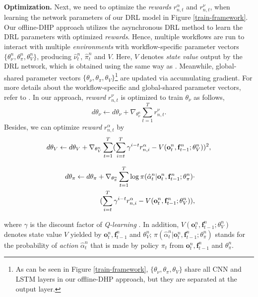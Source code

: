 \documentclass[10pt,journal,compsoc]{IEEEtran}
\begin{document}
\textbf{Optimization.}
Next, we need to optimize the \textit{rewards} $r^{\alpha}_{n,t}$ and $r^{\nu}_{n,t}$, when learning the network parameters of our DRL model in Figure \ref{train-framework}.
Our offline-DHP approach utilizes the asynchronous DRL method \cite{mnih2016asynchronous} to learn the DRL parameters with optimized \textit{rewards}.
Hence, multiple workflows are run to interact with multiple \textit{environments} with workflow-specific parameter vectors $\{ \theta^{n}_{\nu}, \theta^{n}_{\pi}, \theta^{n}_{V} \}$, producing $\hat{\nu}^n_t$, $\hat{\pi}^n_t$ and $V$.
Here, $V$ denotes \textit{state value} output by the DRL network, which is obtained using the same way as \cite{mnih2016asynchronous}.
Meanwhile, global-shared parameter vectors $\{ \theta_{\nu}, \theta_{\pi}, \theta_{V} \}$\footnote{As can be seen in Figure \ref{train-framework}, $\{ \theta_{\nu}, \theta_{\pi}, \theta_{V} \}$ share all CNN and LSTM layers in our offline-DHP approach, but they are separated at the output layer.} are updated via accumulating gradient.
For more details about the workflow-specific and global-shared parameter vectors, refer to \cite{mnih2016asynchronous}.
In our approach, \textit{reward} $r^{\nu}_{n,t}$ is optimized to train $\theta_{\nu}$ as follows,
\begin{equation}
\label{opt-1}
d \theta_{\nu} \leftarrow d \theta_{\nu} + \nabla_{\theta_{\nu}^{n}} \sum_{t=1}^{T} r^{\nu}_{n,t}.
\end{equation}
Besides, we can optimize \textit{reward} $r^{\alpha}_{n,t}$ by
\begin{equation}
\label{opt-2}
\small d \theta_{V} \leftarrow d \theta_{V} + \nabla_{\theta_{V}^{n}} \sum_{t = 1}^{T} (\sum_{i=t}^{T} \gamma^{i-t} r^{\alpha}_{n,i} - V(\mathbf{o}^n_{t}, \mathbf{f}^n_{t-1} ; \theta_{V}^{n}))^2,
\end{equation}
\begin{small}
\begin{eqnarray}
\label{opt-3}
\hspace{0.1cm} \nonumber d \theta_{\pi} \leftarrow d \theta_{\pi} +\nabla_{\theta_{\pi}^{n}} \sum_{t = 1}^{T} \log \pi( \hat{\alpha}^n_{t} | \mathbf{o}^n_{t}, \mathbf{f}^n_{t-1} ; \theta_{\pi}^{n})\cdot \\
(\sum_{i = t}^{T} \gamma^{i-t} r^{\alpha}_{n,i} - V(\mathbf{o}^n_{t}, \mathbf{f}^n_{t-1} ; \theta_{V}^{n})),
\end{eqnarray}
\end{small}
where $\gamma$ is the discount factor of \textit{Q-learning} \cite{watkins1992q}.
In addition, $V(\mathbf{o}^n_{t}, \mathbf{f}^n_{t-1} ; \theta_{V}^{n})$ denotes state value $V$ yielded by $\mathbf{o}^n_{t}, \mathbf{f}^n_{t-1}$ and $\theta_{V}^{n}$; $\pi( \hat{\alpha}^n_{t} | \mathbf{o}^n_{t}, \mathbf{f}^n_{t-1} ; \theta_{\pi}^{n})$ stands for the probability of \textit{action} $\hat{\alpha}^n_{t}$ that is made by policy $\pi_t$ from $\mathbf{o}^n_{t}, \mathbf{f}^n_{t-1}$ and $\theta_{\pi}^{n}$.
\end{document}
